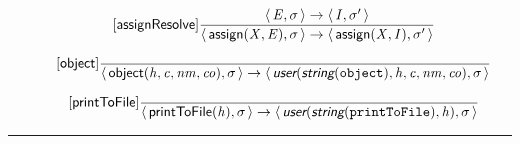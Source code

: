 \documentclass[10pt,leqno]{article}
\newcommand{\artVariable}[1]{\mbox{\em #1\/}}
\newcommand{\artConstructor}[1]{\mbox{\sf #1}}
\newcommand{\artCaseInsensitiveLiteral}[1]{\mbox{\tt #1}}
\newcommand{\artSpecial}[1]{\mbox{\sf\em #1}}
\begin{document}
\begin{equation}
\tag*{[\artConstructor{\sf assignResolve}]}\frac{\langle\, \artVariable{E}, \artVariable{$\sigma$}\,\rangle \rightarrow \langle\, \artVariable{I}, \artVariable{$\sigma$\/$^\prime$}\,\rangle }{\langle\, \artConstructor{\sf assign}(\artVariable{X}, \artVariable{E}), \artVariable{$\sigma$}\,\rangle \rightarrow \langle\, \artConstructor{\sf assign}(\artVariable{X}, \artVariable{I}), \artVariable{$\sigma$\/$^\prime$}\,\rangle }
\end{equation}

\begin{equation}
\tag*{[\artConstructor{\sf object}]}\frac{}{\langle\, \artConstructor{\sf object}(\artVariable{h}, \artVariable{c}, \artVariable{nm}, \artVariable{co}), \artVariable{$\sigma$}\,\rangle \rightarrow \langle\, \artSpecial{user}(\artSpecial{string}(\artCaseInsensitiveLiteral{object}), \artVariable{h}, \artVariable{c}, \artVariable{nm}, \artVariable{co}), \artVariable{$\sigma$}\,\rangle }
\end{equation}

\begin{equation}
\tag*{[\artConstructor{\sf printToFile}]}\frac{}{\langle\, \artConstructor{\sf printToFile}(\artVariable{h}), \artVariable{$\sigma$}\,\rangle \rightarrow \langle\, \artSpecial{user}(\artSpecial{string}(\artCaseInsensitiveLiteral{printToFile}), \artVariable{h}), \artVariable{$\sigma$}\,\rangle }
\end{equation}

\hrule
\end{document}
